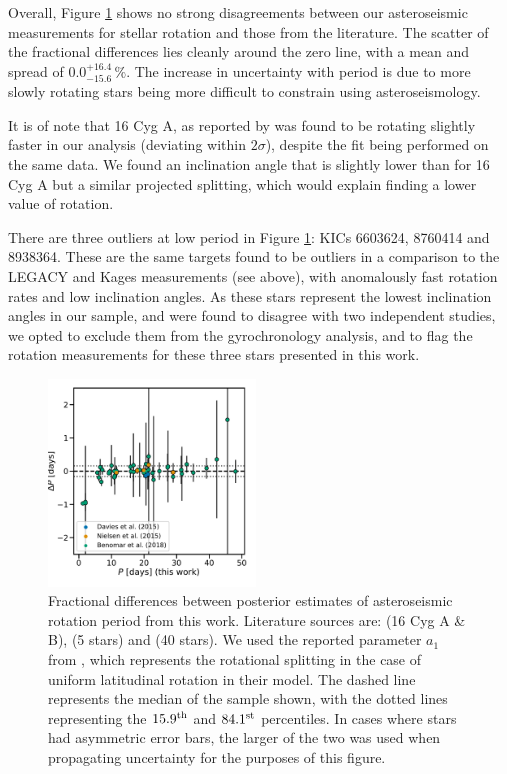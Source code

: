 Overall, Figure \ref{fig:literaturecomp} shows no strong disagreements between our asteroseismic measurements for stellar rotation and those from the literature. The scatter of the fractional differences lies cleanly around the zero line, with a mean and spread of $0.0_{-15.6}^{+16.4}\, \%$. The increase in uncertainty with period is due to more slowly rotating stars being more difficult to constrain using asteroseismology.

It is of note that 16 Cyg A, as reported by \cite{davies+2015} was found to be rotating slightly faster in our analysis (deviating within $2\sigma$), despite the fit being performed on the same data. We found an inclination angle that is slightly lower than \cite{davies+2015} for 16 Cyg A but a similar projected splitting, which would explain finding a lower value of rotation.

There are three outliers at low period in Figure \ref{fig:literaturecomp}: KICs 6603624, 8760414 and 8938364. These are the same targets found to be outliers in a comparison to the LEGACY and Kages measurements (see above), with anomalously fast rotation rates and low inclination angles. As these stars represent the lowest inclination angles in our sample, and were found to disagree with two independent studies, we opted to exclude them from the gyrochronology analysis, and to flag the rotation measurements for these three stars presented in this work.

\begin{figure}
	\centering
	\includegraphics[width=0.49\textwidth]{Images/seis_comparison_rot_alt2.pdf}
	\caption{Fractional differences between posterior estimates of asteroseismic rotation period from this work. Literature sources are: \cite{davies+2015} (16 Cyg A \& B), \cite{nielsen+2015} (5 stars) and \cite{benomar+2018} (40 stars). We used the reported parameter $a_{1}$ from \cite{benomar+2018}, which represents the rotational splitting in the case of uniform latitudinal rotation in their model. The dashed line represents the median of the sample shown, with the dotted lines representing the $15.9^{\rm{th}}$ and $84.1^{\rm{st}}$ percentiles. In cases where stars had asymmetric error bars, the larger of the two was used when propagating uncertainty for the purposes of this figure.}
	\label{fig:literaturecomp}
\end{figure}

